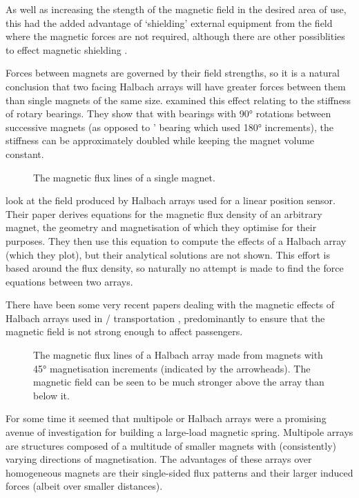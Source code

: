 As well as increasing the stength of the magnetic field in the desired area of use, this had the added advantage of `shielding' external equipment from the field where the magnetic forces are not required, although there are other possiblities to effect magnetic shielding \cite{becherini2009}.

\textcite{choi2008}

Forces between magnets are governed by their field strengths, so
it is a natural conclusion that two facing Halbach arrays will
have greater forces between them than single magnets of the same
size. \textcite{yonnet1991} examined this effect relating to the
stiffness of rotary bearings. They show that with bearings with
\ang{90} rotations between successive magnets (as opposed to
\citeauthor{backers1961}' %
bearing which used \ang{180}
increments), the stiffness can be approximately doubled while
keeping the magnet volume constant.

\begin{figure}
\caption{The magnetic flux lines of a single magnet.}
\end{figure}

\textcite{bancel1998} look at the field produced by Halbach
arrays used for a linear position sensor. Their paper derives
equations for the magnetic flux density of an arbitrary magnet,
the geometry and magnetisation of which they optimise for their
purposes. They then use this equation to compute the effects of
a Halbach array (which they plot), but their analytical
solutions are not shown. This effort is based around the flux
density, so naturally no attempt is made to find the force
equations between two arrays.

There have been some very recent papers dealing with the
magnetic effects of Halbach arrays used in \maglev/
transportation \cite{hoburg2004}, predominantly to ensure
that the magnetic field is not strong enough to affect
passengers.

\begin{figure}
\caption[Magnetic flux lines of a Halbach array.]{%
  The magnetic flux lines of a Halbach array made from magnets with \ang{45}
  magnetisation increments (indicated by the arrowheads). The magnetic field
  can be seen to be much stronger above the array than below it.}
\end{figure}

For some time it seemed that multipole or Halbach arrays were a
promising avenue of investigation for building a large-load magnetic
spring. Multipole arrays are structures composed of a multitude of
smaller magnets with (consistently) varying directions of
magnetisation. The advantages of these arrays over homogeneous magnets
are their single-sided flux patterns and their larger induced forces
(albeit over smaller distances).

